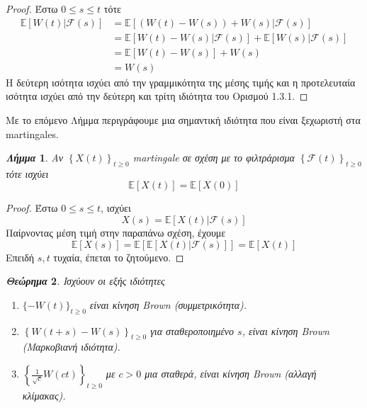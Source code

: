 \documentclass[12pt,a4paper,twoside,openany]{book}
\newtheorem{theorem}{\textit{Θεώρημα}}[section]
\newtheorem{lemma}[theorem]{\textit{Λήμμα}}
\begin{document}
		\begin{proof}
			Έστω $0\leq s \leq t$ τότε
			\begin{align*}
				\mathbb{E}[W(t)|\mathcal{F}(s)] &= \mathbb{E}[(W(t)-W(s))+W(s)|\mathcal{F}(s)] \\
				&= \mathbb{E}[W(t)-W(s)|\mathcal{F}(s)] + \mathbb{E}[W(s)|\mathcal{F}(s)] \\
				&= \mathbb{E}[W(t)-W(s)] + W(s) \\
				&= W(s)
			\end{align*}
		Η δεύτερη ισότητα ισχύει από την γραμμικότητα της μέσης τιμής και η προτελευταία ισότητα ισχύει από την δεύτερη και τρίτη ιδιότητα του Ορισμού 1.3.1.
		\end{proof}
	\vspace{2.5mm}
	\noindent Με το επόμενο Λήμμα περιγράφουμε μια σημαντική ιδιότητα που είναι ξεχωριστή στα martingales.
	\begin{lemma}\label{MartingaleLemma}
		Αν $\left\{X(t)\right\}_{t\geq0}$ martingale σε σχέση με το φιλτράρισμα $\left\{\mathcal{F}(t)\right\}_{t\geq0}$ τότε ισχύει
		\[\mathbb{E}[X(t)]= \mathbb{E}[X(0)]\]
	\end{lemma}
	\begin{proof}
		Έστω $0\leq s \leq t$, ισχύει \[X(s)= \mathbb{E}[X(t)|\mathcal{F}(s)] \] 
		Παίρνοντας μέση τιμή στην παραπάνω σχέση, έχουμε
		\[\mathbb{E}[X(s)]= \mathbb{E}\left[\mathbb{E}[X(t)|\mathcal{F}(s)]\right]=\mathbb{E}[X(t)] \]
		Επειδή $s,t$ τυχαία, έπεται το ζητούμενο.
	\end{proof}
		\begin{theorem}
			Ισχύουν οι εξής ιδιότητες
			\begin{enumerate}[label=(\roman*)]
					\item $\{-W(t)\}_{t\geq0}$ είναι κίνηση Brown (συμμετρικότητα).
					\item $\left\{W(t+s)-W(s)\right\}_{t\geq0}$ για σταθεροποιημένο $s$, είναι κίνηση Brown (Μαρκοβιανή ιδιότητα).
					\item $\left\{\frac{1}{\sqrt{c}} W(ct)\right\}_{t\geq0}$ με $c>0$ μια σταθερά, είναι κίνηση Brown (αλλαγή κλίμακας).
			\end{enumerate}
		\end{theorem}
\end{document}
